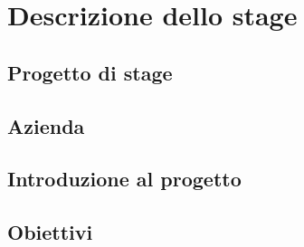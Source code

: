 \chapter{Descrizione dello stage}\label{chapter:formattazione}
\section{Progetto di stage}\label{sec:cap_sec_subsec}
\section{Azienda}\label{sec:images}
\section{Introduzione al progetto}\label{sec:code}
\section{Obiettivi}





